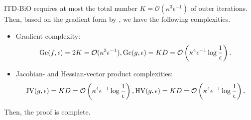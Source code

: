 \documentclass{osudissert96}
\begin{document}
ITD-BiO requires at most the total number $K=\mathcal{O}(\kappa^3\epsilon^{-1})$ of outer iterations. 
Then, based on the gradient form by , we have the following complexities.
\begin{itemize}
\item Gradient complexity: $$\mbox{\normalfont Gc}(f,\epsilon)=2K=\mathcal{O}(\kappa^3\epsilon^{-1}), \mbox{\normalfont Gc}(g,\epsilon)=KD=\mathcal{O}\left(\kappa^4\epsilon^{-1}\log\frac{1}{\epsilon}\right).$$
\item Jacobian- and Hessian-vector product complexities: $$ \mbox{\normalfont JV}(g,\epsilon)=KD=\mathcal{O}\left(\kappa^4\epsilon^{-1}\log\frac{1}{\epsilon}\right), \mbox{\normalfont HV}(g,\epsilon)=KD=\mathcal{O}\left(\kappa^4\epsilon^{-1}\log\frac{1}{\epsilon}\right).$$
\end{itemize}
Then, the proof is complete. 
\end{document}
